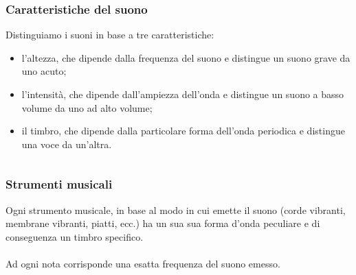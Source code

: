 \documentclass[]{beamer}
\theoremstyle{plain}
\begin{document}
\begin{frame}
\frametitle{Caratteristiche del suono}
Distinguiamo i suoni in base a tre caratteristiche:
\begin{itemize}
  \item l'\alert<1>{altezza}, che dipende dalla frequenza del suono e distingue un suono grave da uno acuto;\pause
  \item l'\alert<2>{intensità}, che dipende dall'ampiezza dell'onda e distingue un suono a basso volume da uno ad alto volume;\pause
  \item il \alert<3>{timbro}, che dipende dalla particolare forma dell'onda periodica e distingue una voce da un'altra.
\end{itemize}
\begin{columns}
\begin{column}{0.3\textwidth}
\end{column}
\begin{column}{0.3\textwidth}
\end{column}
\begin{column}{0.3\textwidth}
\end{column}
\end{columns}
\end{frame}


\begin{frame}
\frametitle{Strumenti musicali}
Ogni strumento musicale, in base al modo in cui emette il suono (corde vibranti, membrane vibranti, piatti, ecc.) ha un sua sua forma d'onda peculiare e di conseguenza un timbro specifico.\\~\\

Ad ogni nota corrisponde una esatta frequenza del suono emesso.\\~\\
\begin{center}
\href{video/Gopro1.mp4}{}~~~~~~~~~~~~~~~\href{video/Gopro2.mp4}{}
\end{center}
\end{frame}
\end{document}
